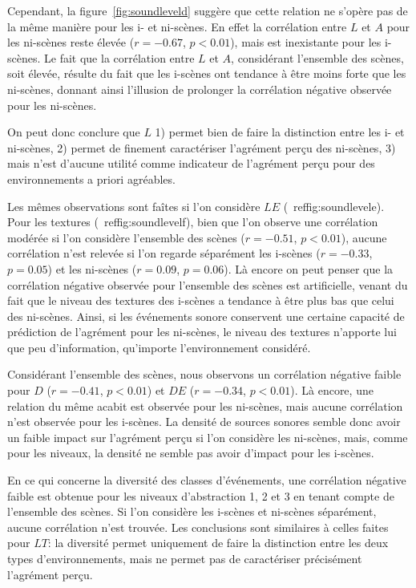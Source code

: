 Cependant, la figure~\ref{fig:soundleveld} suggère que cette relation ne s'opère pas de la même manière pour les i- et ni-scènes. En effet la corrélation  entre $L$ et $A$ pour les ni-scènes reste élevée ($r=-0.67$, $p<0.01$), mais est inexistante pour les i-scènes. Le fait que la corrélation entre $L$ et $A$, considérant l'ensemble des scènes, soit élevée,  résulte du fait que les i-scènes ont tendance à être moins forte que les ni-scènes, donnant ainsi l'illusion de prolonger la corrélation négative observée pour les ni-scènes.  

On peut donc conclure que $L$ 1) permet bien de faire la distinction entre les i- et ni-scènes, 2) permet de finement caractériser l'agrément perçu des ni-scènes, 3) mais n'est d'aucune utilité comme indicateur de l'agrément perçu  pour des environnements a priori agréables. 

Les mêmes observations sont faîtes si l'on considère $LE$ (\cf~ref{fig:soundlevele}). Pour les textures (\cf~ref{fig:soundlevelf}), bien que l'on observe une corrélation modérée si l'on considère l'ensemble des scènes ($r=-0.51$, $p<0.01$), aucune corrélation n'est relevée si l'on regarde séparément les i-scènes ($r=-0.33$, $p=0.05$) et les ni-scènes ($r=0.09$, $p=0.06$). Là encore on peut penser que la corrélation négative observée pour l'ensemble des scènes est artificielle, venant du fait que le niveau des textures des i-scènes a tendance à être plus bas que celui des ni-scènes. Ainsi, si les événements sonore conservent une certaine capacité de prédiction de l'agrément pour les ni-scènes, le niveau des textures n'apporte lui que peu d'information, qu'importe l'environnement considéré.

Considérant l'ensemble des scènes, nous observons un corrélation négative faible pour $D$ ($r=-0.41$, $p<0.01$) et $DE$ ($r=-0.34$, $p<0.01$). Là encore, une relation du même acabit est observée pour les ni-scènes, mais aucune corrélation n'est observée pour les i-scènes. La densité de sources sonores semble donc avoir un faible impact sur l'agrément perçu si l'on considère les ni-scènes, mais, comme pour les niveaux, la densité ne semble pas avoir d'impact pour les i-scènes.

En ce qui concerne la diversité des classes d'événements, une corrélation négative faible est obtenue pour les niveaux d'abstraction 1, 2 et 3 en tenant compte de l'ensemble des scènes. Si l'on considère les i-scènes et ni-scènes séparément, aucune corrélation n'est trouvée. Les conclusions sont similaires à celles faites pour $LT$: la diversité permet uniquement de faire la distinction entre les deux types d'environnements, mais ne permet pas de caractériser précisément l'agrément perçu.

